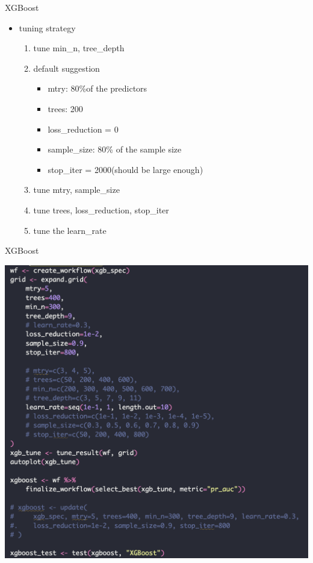 \documentclass[
  ignorenonframetext,
]{beamer}
\begin{document}
\begin{frame}{XGBoost}
  \begin{itemize}
    \item tuning strategy
    \begin{enumerate}
      \item tune min\_n, tree\_depth
      \item default suggestion
      \begin{itemize}
        \item mtry: 80\%of the predictors
        \item trees: 200
        \item loss\_reduction = 0
        \item sample\_size: 80\% of the sample size
        \item stop\_iter = 2000(should be large enough)
      \end{itemize}
      \item tune mtry, sample\_size
      \item tune trees, loss\_reduction, stop\_iter
      \item tune the learn\_rate
    \end{enumerate}
  \end{itemize}
\end{frame}


\begin{frame}{XGBoost}
  \begin{center}
    \includegraphics{figure/pdf/xgb2.png}
  \end{center}
\end{frame}
\end{document}
